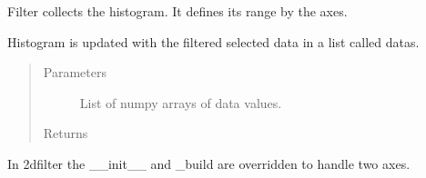 \documentclass[letterpaper,10pt,english]{sphinxmanual}
\begin{document}
\begin{fulllineitems}
\label{\detokenize{autodocs/plot:listmode.plot.Filter1d}}
\sphinxAtStartPar
Filter collects the histogram. It defines its range by the axes.

\begin{fulllineitems}
\label{\detokenize{autodocs/plot:listmode.plot.Filter1d.update}}
\sphinxAtStartPar
Histogram is updated with the filtered selected data in a list called datas.
\begin{quote}\begin{description}
\item[{Parameters}] \leavevmode
\sphinxAtStartPar
{} \textendash{} List of numpy arrays of data values.

\item[{Returns}] \leavevmode
\sphinxAtStartPar


\end{description}\end{quote}

\end{fulllineitems}


\end{fulllineitems}


\begin{fulllineitems}
\label{\detokenize{autodocs/plot:listmode.plot.Filter2d}}
\sphinxAtStartPar
In 2d\sphinxhyphen{}filter the \_\_init\_\_ and \_build are overridden to handle two axes.

\end{fulllineitems}

\end{document}
